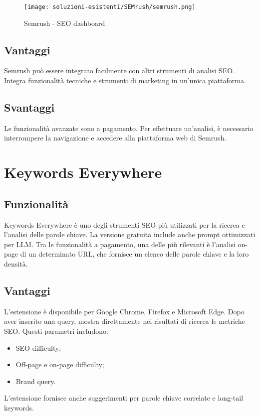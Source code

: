 \begin{figure}[H] 
    \centering 
    \texttt{[image: soluzioni-esistenti/SEMrush/semrush.png]} 
    \caption{Semrush - SEO dashboard}
\end{figure}

\subsection{Vantaggi}
\par Semrush può essere integrato facilmente con altri strumenti di analisi SEO. Integra funzionalità tecniche e strumenti di marketing in un'unica piattaforma.

\subsection{Svantaggi}
\par Le funzionalità avanzate sono a pagamento. Per effettuare un'analisi, è necessario interrompere la navigazione e accedere alla piattaforma web di Semrush.

\section{Keywords Everywhere}

\subsection{Funzionalità}
\par Keywords Everywhere è uno degli strumenti SEO più utilizzati per la ricerca e l'analisi delle parole chiave. La versione gratuita include anche prompt ottimizzati per LLM. Tra le funzionalità a pagamento, una delle più rilevanti è l'analisi on-page di un determinato URL, che fornisce un elenco delle parole chiave e la loro densità.

\subsection{Vantaggi}
\par L'estensione è disponibile per Google Chrome, Firefox e Microsoft Edge. Dopo aver inserito una query, mostra direttamente nei risultati di ricerca le metriche SEO. Questi parametri includono:
\begin{itemize}
    \item SEO difficulty;
    \item Off-page e on-page difficulty;
    \item Brand query.
\end{itemize}
\par L’estensione fornisce anche suggerimenti per parole chiave correlate e long-tail keywords.

